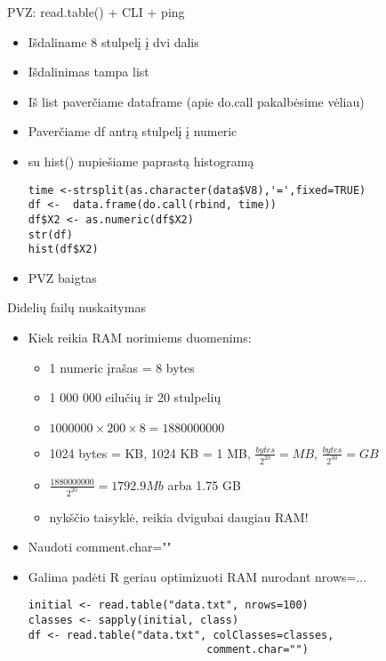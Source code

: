 \documentclass[11pt,xcolor=table]{beamer}
\begin{document}
\begin{frame}[fragile]{PVZ: read.table() + CLI + ping}
\begin{itemize}
\item Išdaliname 8 stulpelį į dvi dalis
\item Išdalinimas tampa list
\item Iš list paverčiame dataframe  (apie do.call pakalbėsime vėliau)
\item Paverčiame df antrą stulpelį į numeric
\item su hist() nupiešiame paprastą histogramą
\begin{lstlisting}
time <-strsplit(as.character(data$V8),'=',fixed=TRUE)
df <-  data.frame(do.call(rbind, time))
df$X2 <- as.numeric(df$X2)
str(df)
hist(df$X2)
\end{lstlisting}
\item PVZ baigtas
\end{itemize}
\end{frame}


\begin{frame}[fragile]{Didelių failų nuskaitymas}
\begin{itemize}
\item Kiek reikia RAM norimiems duomenims:
\begin{itemize}
\item 1 numeric įrašas = 8 bytes
\item 1 000 000 eilučių ir 20 stulpelių 
\item $1000000 \times 200 \times 8=1880000000$
\item 1024 bytes = KB, 1024 KB = 1 MB, $\frac{bytes}{2^{20}}=MB$, $\frac{bytes}{2^{30}}=GB$
\item $\frac{1880000000}{2^{20}}=1792.9Mb$ arba 1.75 GB
\item nykščio taisyklė, reikia dvigubai daugiau RAM!
\end{itemize}
\item Naudoti comment.char=""
\item Galima padėti R geriau optimizuoti RAM nurodant nrows=...
\begin{lstlisting}
initial <- read.table("data.txt", nrows=100)
classes <- sapply(initial, class)
df <- read.table("data.txt", colClasses=classes,
							comment.char="")
\end{lstlisting}
\end{itemize}
\end{frame}
\end{document}
